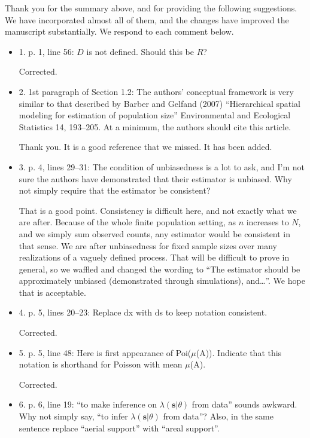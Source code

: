 \documentclass[12pt, titlepage]{article}
\def\bs{\textbf{s}}
\begin{document}
Thank you for the summary above, and for providing the following suggestions.  We have incorporated almost all of them, and the changes have improved the manuscript substantially.  We respond to each comment below.

\begin{itemize}

\item {\color{red!70!black} 1. p. 1, line 56: $D$ is not defined. Should this be $R$?}

  Corrected.

\item {\color{red!70!black} 2. 1st paragraph of Section 1.2: The authors’ conceptual framework is very similar to that described by Barber and Gelfand (2007) ``Hierarchical spatial modeling for estimation of population size'' Environmental and Ecological Statistics 14, 193--205. At a minimum, the authors should cite this article.}

  Thank you.  It is a good reference that we missed.  It has been added.

\item {\color{red!70!black} 3. p. 4, lines 29--31: The condition of unbiasedness is a lot to ask, and I’m not sure the authors have demonstrated that their estimator is unbiased. Why not simply require that the estimator be consistent?}

  That is a good point.  Consistency is difficult here, and not exactly what we are after.  Because of the whole finite population setting, as $n$ increases to $N$, and we simply sum observed counts, any estimator would be consistent in that sense.  We are after unbiasedness for fixed sample sizes over many realizations of a vaguely defined process.  That will be difficult to prove in general, so we waffled and changed the wording to ``The estimator should be approximately unbiased (demonstrated through simulations), and\dots''.  We hope that is acceptable.

\item {\color{red!70!black} 4. p. 5, lines 20--23: Replace dx with ds to keep notation consistent.}

  Corrected.

\item {\color{red!70!black} 5. p. 5, line 48: Here is first appearance of Poi($\mu$(A)). Indicate that this notation is shorthand for Poisson with mean $\mu$(A).}

  Corrected.

\item {\color{red!70!black} 6. p. 6, line 19: ``to make inference on $\lambda(\bs|\theta)$ from data'' sounds awkward. Why not simply say, ``to infer $\lambda(\bs|\theta)$ from data''? Also, in the same sentence replace ``aerial support'' with ``areal support''.}


\end{itemize}
\end{document}
